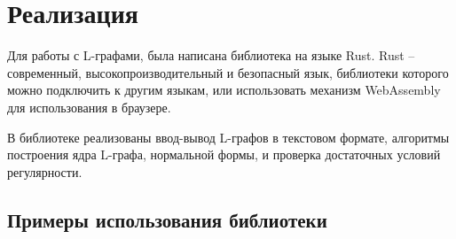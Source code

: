 \chapter{Реализация}

Для работы с L-графами, была написана библиотека на языке Rust. 
Rust -- современный, высокопроизводительный и безопасный язык, библиотеки которого
можно подключить к другим языкам, или использовать механизм WebAssembly для использования
в браузере.

В библиотеке реализованы ввод-вывод L-графов в текстовом формате, 
алгоритмы построения ядра L-графа, нормальной формы, и проверка достаточных условий регулярности.


\section{Примеры использования библиотеки}



\pagebreak